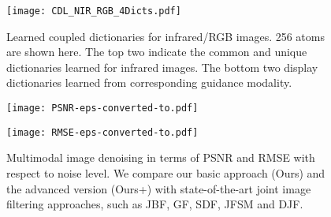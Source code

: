 \documentclass{article}
\begin{document}
\begin{figure}[t]
	\centering
	\texttt{[image: CDL\_NIR\_RGB\_4Dicts.pdf]} %
	
	\vspace{-0.2cm}
	
	\caption{Learned coupled dictionaries for infrared/RGB images. 256 atoms are shown here. The top two indicate the common and unique dictionaries learned for infrared images. The bottom two display dictionaries learned from corresponding guidance modality.}
	\label{Fig:LearnedD}
\end{figure}




\begin{figure}[t]
	\centering
	\begin{minipage}[b]{0.48\linewidth}
		\centering
		\texttt{[image: PSNR-eps-converted-to.pdf]} 
	\end{minipage}
	\begin{minipage}[b]{0.48\linewidth}
		\centering
		\texttt{[image: RMSE-eps-converted-to.pdf]}
	\end{minipage}

	\vspace{-0.2cm}
	
	\caption{Multimodal image denoising in terms of PSNR and RMSE with respect to noise level. We compare our basic approach (Ours) and the advanced version (Ours+) with state-of-the-art joint image filtering approaches, such as JBF\cite{kopf2007joint}, GF\cite{he2013guided}, SDF\cite{ham2017robust}, JFSM\cite{shen2015multispectral} and DJF\cite{li2016deep}.}
	\label{Fig:PSNR_RMSE}
\end{figure}
\end{document}
